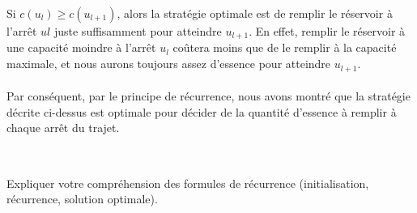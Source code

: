 \documentclass[a4paper,11pt]{article}
\begin{document}
{Si $c(u_l) \geq c(u_{l + 1})$, alors la stratégie optimale est de remplir le réservoir à l'arrêt $ul$ juste suffisamment pour atteindre $u_{l + 1}$. En effet, remplir le réservoir à une capacité moindre à l'arrêt $u_l$ coûtera moins que de le remplir à la capacité maximale, et nous aurons toujours assez d'essence pour atteindre $u_{l + 1}$.
\\\\
Par conséquent, par le principe de récurrence, nous avons montré que la stratégie décrite ci-dessus est optimale pour décider de la quantité d'essence à remplir à chaque arrêt du trajet.   
\\\\}

	\subsection{}\label{subsec:Q9}
        Expliquer votre compréhension des formules de récurrence (initialisation, récurrence, solution optimale). 
\end{document}
